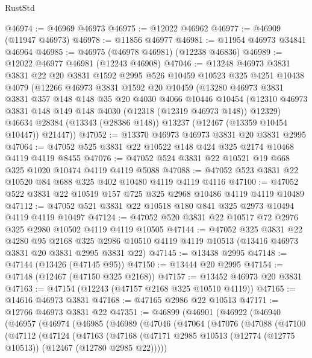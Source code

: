 \begin{lexlean}{RustStd}
\begin{coremodule}
@46974 := @46969 @46973
@46975 := @12022 @46962
@46977 := @46909 (@11947 @46973)
@46978 := @11856 @46977
@46981 := @11954 @46973 @34841 @46964
@46985 := @46975 (@46978 @46981) (@12238 @46836)
@46989 := @12022 @46977 @46981 (@12243 @46908)
@47046 := @13248
    @46973
    @3831
    @3831
    @22
    @20
    @3831
    @1592
    @2995
    @526
    @10459
    @10523
    @325
    @4251
    @10438
    @4079
    (@12266
      @46973
      @3831
      @1592
      @20
      @10459
      (@13280
        @46973
        @3831
        @3831
        @357
        @148
        @148
        @35
        @20
        @4030
        @4066
        @10446
        @10454
        (@12310 @46973 @3831 @148 @149 @148 @4030 (@12318 (@12319 @46973 @148)) @12329)
        @46634
        @28384
        (@13343 (@28386 @148))
        @13237
        (@12467 (@13359 @10454 @10447))
        @21447))
@47052 := @13370 @46973 @46973 @3831 @20 @3831 @2995
@47064 := @47052 @525 @3831 @22 @10522 @148 @424 @325 @2174 @10468 @4119 @4119 @8455
@47076 := @47052 @524 @3831 @22 @10521 @19 @668 @325 @1020 @10474 @4119 @4119 @5088
@47088 := @47052 @523 @3831 @22 @10520 @84 @688 @325 @402 @10480 @4119 @4119 @4116
@47100 := @47052 @522 @3831 @22 @10519 @157 @725 @325 @2968 @10486 @4119 @4119 @10489
@47112 := @47052 @521 @3831 @22 @10518 @180 @841 @325 @2973 @10494 @4119 @4119 @10497
@47124 := @47052 @520 @3831 @22 @10517 @72 @2976 @325 @2980 @10502 @4119 @4119 @10505
@47144 := @47052
    @325
    @3831
    @22
    @4280
    @95
    @2168
    @325
    @2986
    @10510
    @4119
    @4119
    @10513
    (@13416 @46973 @3831 @20 @3831 @2995 @3831 @22)
@47145 := @13438 @2995
@47148 := @47144 (@13426 (@47145 @95))
@47150 := @13444 @20 @2995
@47154 := @47148 (@12467 (@47150 @325 @2168))
@47157 := @13452 @46973 @20 @3831
@47163 := @47154 (@12243 (@47157 @2168 @325 @10510 @4119))
@47165 := @14616 @46973 @3831
@47168 := @47165 @2986 @22 @10513
@47171 := @12766 @46973 @3831 @22
@47351 := @46899
    (@46901
      (@46922
        (@46940
          (@46957
            (@46974
              (@46985
                (@46989
                  (@47046
                    (@47064
                      (@47076
                        (@47088
                          (@47100
                            (@47112
                              (@47124
                                (@47163
                                  (@47168
                                    (@47171
                                      @2985
                                      @10513
                                      (@12774 (@12775 @10513))
                                      (@12467 (@12780 @2985 @22)))))

\end{coremodule}
\end{lexlean}
